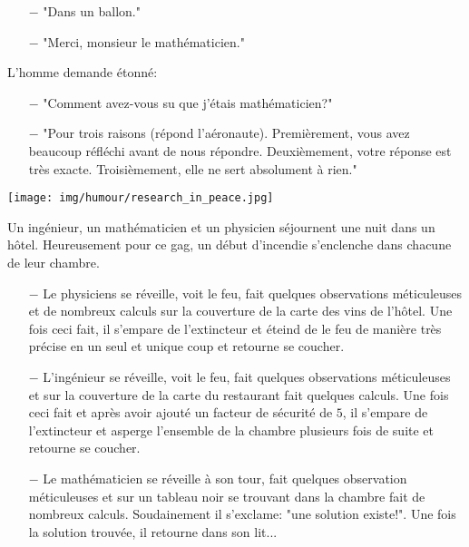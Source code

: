 \begin{itemize}	 
	\item[$-$] "Dans un ballon."

	\item[$-$] "Merci, monsieur le mathématicien."
\end{itemize}

L'homme demande étonné:

\begin{itemize}	 
	\item[$-$] "Comment avez-vous su que j'étais mathématicien?"

	\item[$-$] "Pour trois raisons (répond l'aéronaute). Premièrement, vous avez beaucoup réfléchi avant de nous répondre. Deuxièmement, votre réponse est très exacte. Troisièmement, elle ne sert absolument à rien."
\end{itemize}

\begin{center}\underline{\hspace{5 cm}}\end{center}
	
	\begin{center}
		\texttt{[image: img/humour/research\_in\_peace.jpg]}	
	\end{center}
	
\begin{center}\underline{\hspace{5 cm}}\end{center}

Un ingénieur, un mathématicien et un physicien séjournent une nuit dans un hôtel. Heureusement pour ce gag, un début d'incendie s'enclenche dans chacune de leur chambre.

\begin{itemize}	 
	\item[$-$] Le physiciens se réveille, voit le feu, fait quelques observations méticuleuses et de nombreux calculs sur la couverture de la carte des vins de l'hôtel. Une fois ceci fait, il s'empare de l'extincteur et éteind de le feu de manière très précise en un seul et unique coup et retourne se coucher.

	\item[$-$] L'ingénieur se réveille, voit le feu, fait quelques observations méticuleuses et sur la couverture de la carte du restaurant fait quelques calculs. Une fois ceci fait et après avoir ajouté un facteur de sécurité de $5$, il s'empare de l'extincteur et asperge l'ensemble de la chambre plusieurs fois de suite et retourne se coucher.

	\item[$-$] Le mathématicien se réveille à son tour, fait quelques observation méticuleuses et sur un tableau noir se trouvant dans la chambre fait de nombreux calculs. Soudainement il s'exclame: "une solution existe!". Une fois la solution trouvée, il retourne dans son lit...
\end{itemize}	
\begin{center}\underline{\hspace{5 cm}}\end{center}

